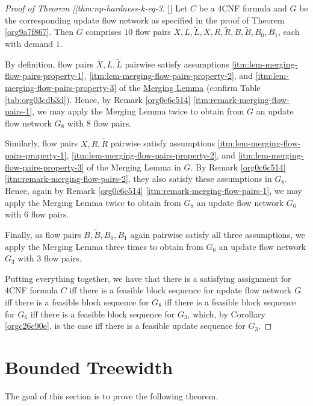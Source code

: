 \documentclass[fontsize=11pt,paper=a4]{book}
\begin{document}
\begin{proof}[Proof of Theorem [[thm:np-hardness-k-eq-3]]]
Let \(C\) be a 4CNF formula and \(G\) be the corresponding update flow network as specified in the proof of Theorem \ref{org9a7f867}.
Then \(G\) comprises \(10\) flow pairs \(\bar{X},L,\tilde{L},X,R,\tilde{R},B,\tilde{B},B_0,B_1\), each with demand \(1\).

By definition, flow pairs \(\bar{X},L,\tilde{L}\) pairwise satisfy assumptions \ref{itm:lem-merging-flow-pairs-property-1}, \ref{itm:lem-merging-flow-pairs-property-2}, and \ref{itm:lem-merging-flow-pairs-property-3} of the \hyperref[org44b4347]{Merging Lemma} (confirm Table \ref{tab:org03cdb3d}).
Hence, by Remark \ref{org0c6c514} \ref{itm:remark-merging-flow-pairs-1}, we may apply the Merging Lemma twice to obtain from \(G\) an update flow network \(G_8\) with \(8\) flow pairs.

Similarly, flow pairs \(X,R,\tilde{R}\) pairwise satisfy assumptions \ref{itm:lem-merging-flow-pairs-property-1}, \ref{itm:lem-merging-flow-pairs-property-2}, and \ref{itm:lem-merging-flow-pairs-property-3} of the Merging Lemma in \(G\).
By Remark \ref{org0c6c514} \ref{itm:remark-merging-flow-pairs-2}, they also satisfy these assumptions in \(G_8\).
Hence, again by Remark \ref{org0c6c514} \ref{itm:remark-merging-flow-pairs-1}, we may apply the Merging Lemma twice to obtain from \(G_8\) an update flow network \(G_6\) with \(6\) flow pairs.

Finally, as flow pairs \(B,\tilde{B},B_0,B_1\) again pairwise satisfy all three assumptions, we apply the Merging Lemma three times to obtain from \(G_6\) an update flow network \(G_3\) with \(3\) flow pairs.

Putting everything together, we have that there is a satisfying assignment for 4CNF formula \(C\) iff there is a feasible block sequence for update flow network \(G\) iff there is a feasible block sequence for \(G_8\) iff there is a feasible block sequence for \(G_6\) iff there is a feasible block sequence for \(G_3\), which, by Corollary \ref{orgc26c90e}, is the case iff there is a feasible update sequence for \(G_3\).
\end{proof}

\part{Bounded Treewidth}
\label{sec:org4230b92}

The goal of this section is to prove the following theorem.
\end{document}
